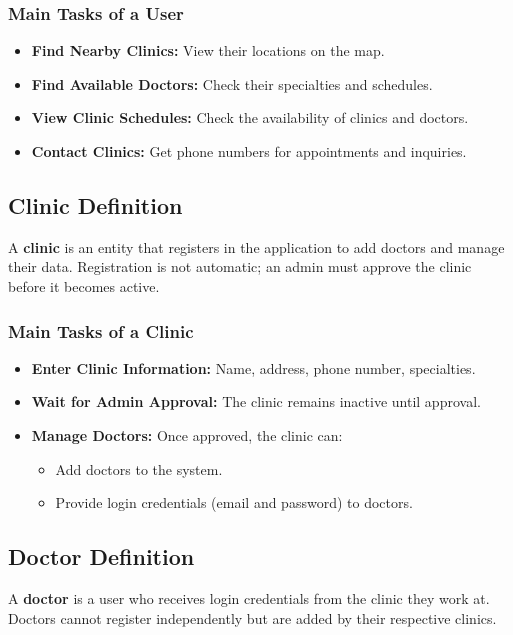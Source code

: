 \documentclass[12pt]{report}
\begin{document}
\subsubsection{\textbf{Main Tasks of a User}}
\begin{itemize}
	\item \textbf{Find Nearby Clinics:} View their locations on the map.
	\item \textbf{Find Available Doctors:} Check their specialties and schedules.
	\item \textbf{View Clinic Schedules:} Check the availability of clinics and doctors.
	\item \textbf{Contact Clinics:} Get phone numbers for appointments and inquiries.
\end{itemize}

\vspace{0.5cm}

\subsection{\textbf{Clinic Definition}}

\noindent A \textbf{clinic} is an entity that registers in the application to add doctors and manage their data. Registration is not automatic; an admin must approve the clinic before it becomes active.

\subsubsection{\textbf{Main Tasks of a Clinic}}
\begin{itemize}
	\item \textbf{Enter Clinic Information:} Name, address, phone number, specialties.
	\item \textbf{Wait for Admin Approval:} The clinic remains inactive until approval.
	\item \textbf{Manage Doctors:} Once approved, the clinic can:
	      \begin{itemize}
		      \item Add doctors to the system.
		      \item Provide login credentials (email and password) to doctors.
	      \end{itemize}
\end{itemize}

\vspace{0.5cm}
\subsection{\textbf{Doctor Definition}}
\noindent A \textbf{doctor} is a user who receives login credentials from the clinic they work at. Doctors cannot register independently but are added by their respective clinics.
\end{document}
